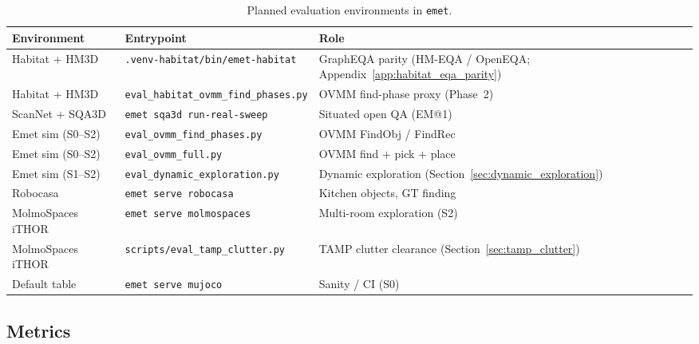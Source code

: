 \begin{table}[t]
  \centering
  \caption{Planned evaluation environments in \texttt{emet}.}
  \label{tab:envs}
  \small
  \begin{tabular}{@{}lll@{}}
    \toprule
    Environment & Entrypoint & Role \\
    \midrule
    Habitat + HM3D & \texttt{.venv-habitat/bin/emet-habitat} & GraphEQA parity (HM-EQA / OpenEQA; Appendix~\ref{app:habitat_eqa_parity}) \\
    Habitat + HM3D & \texttt{eval\_habitat\_ovmm\_find\_phases.py} & OVMM find-phase proxy (Phase~2) \\
    ScanNet + SQA3D & \texttt{emet sqa3d run-real-sweep} & Situated open QA (EM@1) \\
    Emet sim (S0--S2) & \texttt{eval\_ovmm\_find\_phases.py} & OVMM FindObj / FindRec \\
    Emet sim (S0--S2) & \texttt{eval\_ovmm\_full.py} & OVMM find + pick + place \\
    Emet sim (S1--S2) & \texttt{eval\_dynamic\_exploration.py} & Dynamic exploration (Section~\ref{sec:dynamic_exploration}) \\
    Robocasa & \texttt{emet serve robocasa} & Kitchen objects, GT finding \\
    MolmoSpaces iTHOR & \texttt{emet serve molmospaces} & Multi-room exploration (S2) \\
    MolmoSpaces iTHOR & \texttt{scripts/eval\_tamp\_clutter.py} & TAMP clutter clearance (Section~\ref{sec:tamp_clutter}) \\
    Default table & \texttt{emet serve mujoco} & Sanity / CI (S0) \\
    \bottomrule
  \end{tabular}
\end{table}

\subsection{Metrics}

